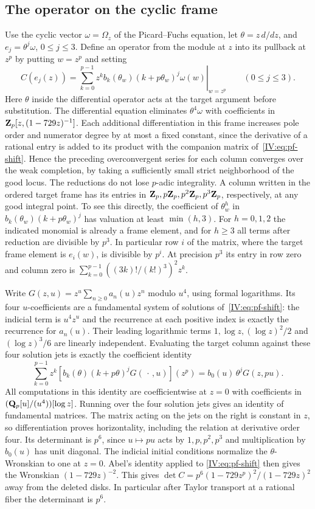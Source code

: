 \documentclass[11pt,letterpaper]{article}
\theoremstyle{definition}
\theoremstyle{remark}
\begin{document}
\subsection{The operator on the cyclic frame}
Use the cyclic vector $\omega=\Omega_z$ of the Picard--Fuchs equation, let
$\theta=z\,d/dz$, and $e_j=\theta^j\omega$, $0\le j\le3$.
Define an operator from the module at $z$ into its pullback at $z^p$
by putting $w=z^p$ and setting
\begin{equation}\label{IV:eq:shift-operator}
 C(e_j(z))=\left.\sum_{k=0}^{p-1} z^k
          b_k(\theta_w)(k+p\theta_w)^j\omega(w)\right|_{w=z^p}
 \qquad(0\le j\le3).
\end{equation}
Here $\theta$ inside the differential operator acts at the target
argument before substitution. The differential equation eliminates
$\theta^4\omega$ with coefficients in
$\mathbf Z_p[z,(1-729z)^{-1}]$. Each additional differentiation in this frame increases pole order and
numerator degree by at most a fixed constant, since the derivative of
a rational entry is added to its product with the companion matrix
of~\eqref{IV:eq:pf-shift}. Hence the preceding overconvergent series for each column
converges over the weak completion, by taking a sufficiently small
strict neighborhood of the good locus. The reductions do not lose
$p$-adic integrality. A column written in the ordered target frame has
its entries in $\mathbf Z_p,p\mathbf Z_p,p^2\mathbf Z_p,p^3\mathbf Z_p$,
respectively, at any good integral point. To see this directly, the
coefficient of $\theta_w^h$ in $b_k(\theta_w)(k+p\theta_w)^j$ has
valuation at least $\min(h,3)$. For $h=0,1,2$ the indicated monomial is
already a frame element, and for $h\ge3$ all terms after reduction are
divisible by $p^3$. In particular row $i$ of the matrix, where the
target frame element is $e_i(w)$, is divisible by $p^i$.
At precision $p^3$ its entry in row zero and column zero is
$\sum_{k=0}^{p-1}((3k)!/(k!)^3)^2 z^k$.

Write $G(z,u)=z^u\sum_{n\ge0}a_n(u)z^n$ modulo $u^4$, using formal
logarithms. Its four $u$-coefficients are a fundamental system of
solutions of~\eqref{IV:eq:pf-shift}: the indicial term is $u^4z^u$ and
the recurrence at each positive index is exactly the recurrence for
$a_n(u)$. Their leading logarithmic terms $1,\log z,(\log z)^2/2$ and
$(\log z)^3/6$ are linearly independent. Evaluating the target column against these four solution
jets is exactly the coefficient identity
\[
  \sum_{k=0}^{p-1}z^k
    [b_k(\theta)(k+p\theta)^jG(\,\cdot\,,u)](z^p)
  =b_0(u)\,\theta^j G(z,pu).
\]
All computations in this identity are coefficientwise at $z=0$ with
coefficients in $(\mathbf Q_p[u]/(u^4))[\log z]$. Running over the four solution jets gives an identity of fundamental
matrices. The matrix acting on the jets on the right is constant
in $z$, so differentiation proves horizontality, including the
relation at derivative order four. Its determinant is $p^6$, since
$u\mapsto pu$ acts by $1,p,p^2,p^3$ and multiplication by $b_0(u)$
has unit diagonal. The indicial initial conditions normalize the
$\theta$-Wronskian to one at $z=0$. Abel's identity applied to
\eqref{IV:eq:pf-shift} then gives the Wronskian $(1-729z)^{-2}$.
This gives $\det C=p^6(1-729z^p)^2/(1-729z)^2$ away from the deleted
disks. In particular after Taylor transport at a rational fiber the
determinant is $p^6$.
\end{document}
